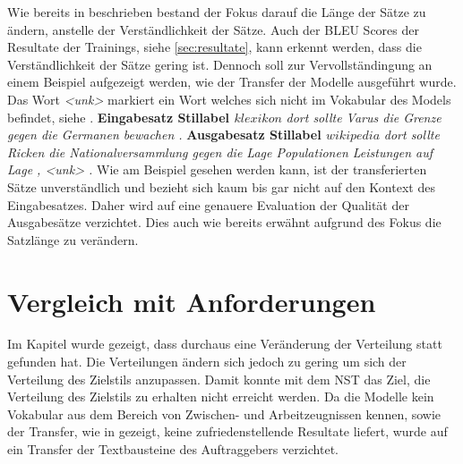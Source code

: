Wie bereits in  beschrieben bestand der Fokus darauf die Länge der Sätze
zu ändern, anstelle der Verständlichkeit der Sätze. Auch der \gls{BLEU} Scores der Resultate der Trainings, siehe
\ref{sec:resultate}, kann erkennt werden, dass die Verständlichkeit der Sätze gering ist. Dennoch soll zur
Vervollständingung an einem Beispiel aufgezeigt werden, wie der Transfer der Modelle ausgeführt wurde. Das Wort
\textit{<unk>} markiert ein Wort welches sich nicht im Vokabular des Models befindet, siehe .
\newline
\newline
\textbf{Eingabesatz Stillabel $ klexikon $}
\newline
\textit{dort sollte Varus die Grenze gegen die Germanen bewachen .}
\newline
\newline
\textbf{Ausgabesatz Stillabel $ wikipedia $}
\newline
\textit{dort sollte Ricken die Nationalversammlung gegen die Lage Populationen Leistungen auf Lage , <unk> .}
\newline 
\newline
Wie am Beispiel gesehen werden kann, ist der transferierten Sätze unverständlich und bezieht sich kaum bis gar nicht auf
den Kontext des Eingabesatzes. Daher wird auf eine genauere Evaluation der Qualität der Ausgabesätze verzichtet. Dies
auch wie bereits erwähnt aufgrund des Fokus die Satzlänge zu verändern.

\section{Vergleich mit Anforderungen}
\label{sec:VergleichAnforderungen}

Im Kapitel  wurde gezeigt, dass durchaus eine Veränderung der Verteilung statt gefunden hat. Die
Verteilungen ändern sich jedoch zu gering um sich der Verteilung des Zielstils anzupassen. Damit konnte mit dem
\gls{NST} das Ziel, die Verteilung des Zielstils zu erhalten nicht erreicht werden. 
\newline
\newline
Da die Modelle kein Vokabular aus dem Bereich von Zwischen- und Arbeitzeugnissen kennen, sowie der Transfer,
wie in  gezeigt, keine zufriedenstellende Resultate liefert, wurde auf ein Transfer der
Textbausteine des Auftraggebers verzichtet.



